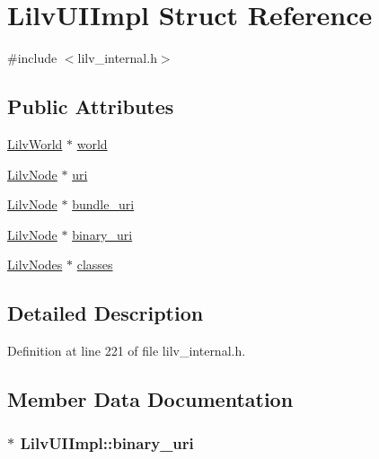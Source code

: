 \hypertarget{struct_lilv_u_i_impl}{}\section{Lilv\+U\+I\+Impl Struct Reference}
\label{struct_lilv_u_i_impl}


{\ttfamily \#include $<$lilv\+\_\+internal.\+h$>$}

\subsection*{Public Attributes}
\begin{DoxyCompactItemize}
\item 
\hyperlink{lilv_8h_a91c1745aa6ffca2b6b87c56df6c5ab86}{Lilv\+World} $\ast$ \hyperlink{struct_lilv_u_i_impl_a769fea1595c8a3c7b32182d62c7dffbb}{world}
\item 
\hyperlink{lilv_8h_ae183dca3dca5368d34dbd863a405437b}{Lilv\+Node} $\ast$ \hyperlink{struct_lilv_u_i_impl_a5935a8137062a5eef57688e6295b6265}{uri}
\item 
\hyperlink{lilv_8h_ae183dca3dca5368d34dbd863a405437b}{Lilv\+Node} $\ast$ \hyperlink{struct_lilv_u_i_impl_afafd4bbee3a55a9f76945a3b12eba3a8}{bundle\+\_\+uri}
\item 
\hyperlink{lilv_8h_ae183dca3dca5368d34dbd863a405437b}{Lilv\+Node} $\ast$ \hyperlink{struct_lilv_u_i_impl_a3bf0e4fe93b90e5ebd9f17f13abfea88}{binary\+\_\+uri}
\item 
\hyperlink{lilv_8h_a256c2c4443307f320de24bb31198df83}{Lilv\+Nodes} $\ast$ \hyperlink{struct_lilv_u_i_impl_acc59c13176894446e108f82b6bff63ae}{classes}
\end{DoxyCompactItemize}


\subsection{Detailed Description}


Definition at line 221 of file lilv\+\_\+internal.\+h.



\subsection{Member Data Documentation}
\subsubsection[{\texorpdfstring{binary\+\_\+uri}{binary_uri}}]{$\ast$ Lilv\+U\+I\+Impl\+::binary\+\_\+uri}\hypertarget{struct_lilv_u_i_impl_a3bf0e4fe93b90e5ebd9f17f13abfea88}{}\label{struct_lilv_u_i_impl_a3bf0e4fe93b90e5ebd9f17f13abfea88}


